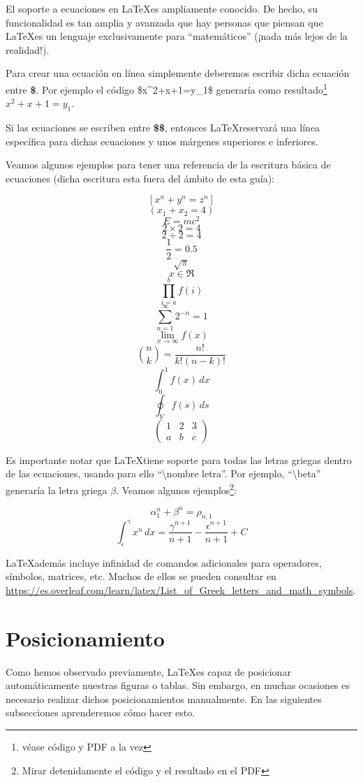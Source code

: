 El soporte a ecuaciones en \LaTeX es ampliamente conocido. De hecho, su funcionalidad es tan amplia y avanzada que hay personas que piensan que \LaTeX es un lenguaje exclusivamente para ``matemáticos'' (¡nada más lejos de la realidad!).

Para crear una ecuación en línea simplemente deberemos escribir dicha ecuación entre \textbf{\$}. Por ejemplo el código \$x\^{}2+x+1=y\_1\$ generaría como resultado\footnote{véase código y PDF a la vez} $x^2+x+1=y_1$.

Si las ecuaciones se escriben entre \textbf{\$\$}, entonces \LaTeX reservará una línea específica para dichas ecuaciones y unos márgenes superiores e inferiores.

Veamos algunos ejemplos para tener una referencia de la escritura básica de ecuaciones (dicha escritura esta fuera del ámbito de esta guía):

$$[ x^n + y^n = z^n ]$$
$$( x_1+x_2=4 )$$
$$E=mc^2$$
$$2\times 2 = 4$$
$$2\div 2 = 4$$
$$\frac{1}{2} = 0.5$$
$$\sqrt{\pi}$$
$$x \in \Re$$
$$\prod_{i=a}^{b} f(i) $$
$$\sum_{n=1}^{\infty} 2^{-n} = 1 $$
$$\lim_{x\to\infty} f(x)$$
$$\binom{n}{k} = \frac{n!}{k!(n-k)!}$$
$$\int_0^1 f(x) \,dx$$
$$\oint_V f(s) \,ds$$
$$\begin{pmatrix}
1 & 2 & 3\\
a & b & c
\end{pmatrix}$$

Es importante notar que \LaTeX tiene soporte para todas las letras griegas dentro de las ecuaciones, usando para ello ``\textbackslash nombre letra''. Por ejemplo, ``\textbackslash beta'' generaría la letra griega $\beta$. Veamos algunos ejemplos\footnote{Mirar detenidamente el código y el resultado en el PDF}:

$$\alpha^n_1 + \beta^n = \rho_{n,1}$$
$$\int_\epsilon^\gamma x^n \,dx = \frac{\gamma^{n+1}}{n+1} - \frac{\epsilon^{n+1}}{n+1} + C$$

\LaTeX además incluye infinidad de comandos adicionales para operadores, símbolos, matrices, etc. Muchos de ellos se pueden consultar en \url{https://es.overleaf.com/learn/latex/List_of_Greek_letters_and_math_symbols}.

\section{Posicionamiento}

Como hemos observado previamente, \LaTeX es capaz de posicionar automáticamente nuestras figuras o tablas. Sin embargo, en muchas ocasiones es necesario realizar dichos posicionamientos manualmente. En las siguientes subsecciones aprenderemos cómo hacer esto.

